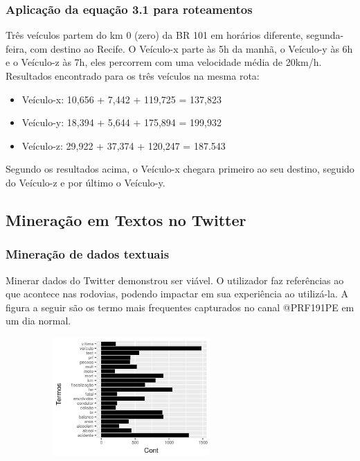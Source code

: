 \documentclass[11pt]{beamer}
\begin{document}
\begin{frame}
	\frametitle{Aplicação da equação 3.1 para roteamentos}
	Três veículos partem do km 0 (zero) da BR 101 em horários diferente, segunda-feira, com destino ao Recife. O Veículo-x parte às 5h da manhã, o Veículo-y às 6h e o Veículo-z às 7h, eles percorrem com uma velocidade média de 20km/h.
	Resultados encontrado para os três veículos na mesma rota:
	 \begin{itemize}
	 	\item Veículo-x: 10,656 +  7,442 + 119,725 = 137,823
	 	\item Veículo-y: 18,394 +  5,644 + 175,894 = 199,932
	 	\item Veículo-z: 29,922 + 37,374 + 120,247 = 187.543
	 \end{itemize}
	Segundo os resultados acima, o Veículo-x chegara primeiro ao seu destino, seguido do Veículo-z e por último o Veículo-y.
\end{frame}


\subsection{Mineração em Textos no Twitter}
\begin{frame}
	\frametitle{Mineração de dados textuais}
	Minerar dados do Twitter demonstrou ser viável.
	O utilizador faz referências ao que acontece nas rodovias, podendo impactar em sua experiência ao utilizá-la.
	A figura a seguir são os termo mais frequentes capturados no canal @PRF191PE em um dia normal.
	\begin{figure}[ht]
		\centering
		\includegraphics[width=75mm, height=45mm]{Figuras/Twitter/freqPalavr}\\
	\end{figure}
\end{frame}
\end{document}
